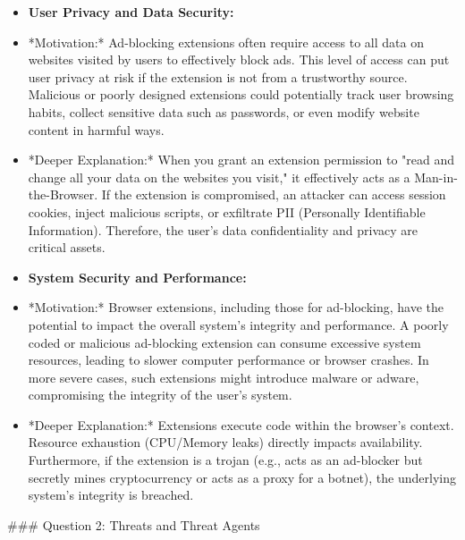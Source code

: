 \documentclass{article}
\begin{document}
\begin{itemize}
    \item[\textbf{1.}] \textbf{User Privacy and Data Security:}
    \item *Motivation:* Ad-blocking extensions often require access to all data on websites visited by users to effectively block ads. This level of access can put user privacy at risk if the extension is not from a trustworthy source. Malicious or poorly designed extensions could potentially track user browsing habits, collect sensitive data such as passwords, or even modify website content in harmful ways.
    \item *Deeper Explanation:* When you grant an extension permission to "read and change all your data on the websites you visit," it effectively acts as a Man-in-the-Browser. If the extension is compromised, an attacker can access session cookies, inject malicious scripts, or exfiltrate PII (Personally Identifiable Information). Therefore, the user's data confidentiality and privacy are critical assets.

    \item[\textbf{2.}] \textbf{System Security and Performance:}
    \item *Motivation:* Browser extensions, including those for ad-blocking, have the potential to impact the overall system's integrity and performance. A poorly coded or malicious ad-blocking extension can consume excessive system resources, leading to slower computer performance or browser crashes. In more severe cases, such extensions might introduce malware or adware, compromising the integrity of the user's system.
    \item *Deeper Explanation:* Extensions execute code within the browser's context. Resource exhaustion (CPU/Memory leaks) directly impacts availability. Furthermore, if the extension is a trojan (e.g., acts as an ad-blocker but secretly mines cryptocurrency or acts as a proxy for a botnet), the underlying system's integrity is breached.

\end{itemize}
\#\#\# Question 2: Threats and Threat Agents
\end{document}

